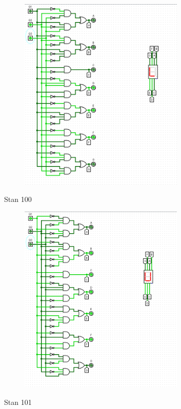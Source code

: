 \documentclass[]{article}
\begin{document}
\begin{figure}[H]
	\centering
	\includegraphics[width=0.7\textwidth]{TTRZY_011.png}
\end{figure}
\newpage
Stan 100
\begin{figure}[H]
	\centering
	\includegraphics[width=0.7\textwidth]{TTRZY_100.png}
\end{figure}
\newpage
Stan 101
\end{document}
